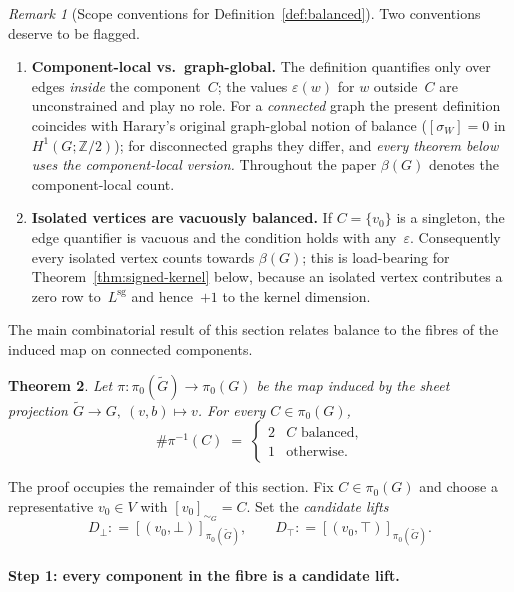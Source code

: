 \documentclass[11pt,a4paper]{amsart}
\theoremstyle{plain}
\newtheorem{theorem}{Theorem}[section]
\theoremstyle{definition}
\theoremstyle{remark}
\newtheorem{remark}[theorem]{Remark}
\newcommand{\ZZ}{\mathbb{Z}}
\newcommand{\tG}{\widetilde{G}}
\newcommand{\Lsigned}{L^{\operatorname{sg}}}
\newcommand{\comp}{\pi_0}
\newcommand{\defeq}{\mathrel{\mathop:}=}
\begin{document}
\begin{remark}[Scope conventions for Definition~\ref{def:balanced}]
\label{rem:balance-scope}
Two conventions deserve to be flagged.
\begin{enumerate}[label=(\alph*)]
  \item \textbf{Component-local vs.\ graph-global.} The definition
    quantifies only over edges \emph{inside} the component~$C$; the
    values $\varepsilon(w)$ for $w$ outside~$C$ are unconstrained and
    play no role. For a \emph{connected} graph the present definition
    coincides with Harary's original graph-global notion of balance
    ($[\sigma_W]=0$ in $H^1(G;\ZZ/2)$); for disconnected graphs they
    differ, and \emph{every theorem below uses the component-local
    version.} Throughout the paper $\beta(G)$ denotes the
    component-local count.
  \item \textbf{Isolated vertices are vacuously balanced.} If
    $C=\{v_0\}$ is a singleton, the edge quantifier is vacuous and
    the condition holds with any~$\varepsilon$. Consequently every
    isolated vertex counts towards $\beta(G)$; this is load-bearing
    for Theorem~\ref{thm:signed-kernel} below, because an isolated
    vertex contributes a zero row to~$\Lsigned$ and hence~$+1$ to the
    kernel dimension.
\end{enumerate}
\end{remark}

The main combinatorial result of this section relates balance to
the fibres of the induced map on connected components.

\begin{theorem}\label{thm:fiber-card}
Let $\pi:\comp(\tG)\to\comp(G)$ be the map induced by the sheet
projection $\tG\to G,\ (v,b)\mapsto v$. For every
$C\in\comp(G)$,
\[
  \#\pi^{-1}(C) \;=\; \begin{cases} 2 & C \text{ balanced,}\\
    1 & \text{otherwise.} \end{cases}
\]
\end{theorem}

The proof occupies the remainder of this section. Fix
$C\in\comp(G)$ and choose a representative $v_0\in V$ with
$[v_0]_{\sim_G}=C$. Set the \emph{candidate lifts}
\[
  D_\bot \defeq [(v_0,\bot)]_{\comp(\tG)}, \qquad
  D_\top \defeq [(v_0,\top)]_{\comp(\tG)}.
\]

\paragraph{Step 1: every component in the fibre is a candidate lift.}
\end{document}
